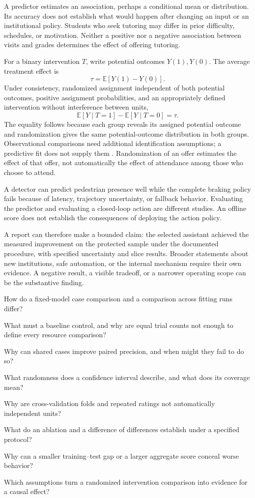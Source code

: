 A predictor estimates an association, perhaps a conditional mean or distribution. Its accuracy does not establish what would happen after changing an input or an institutional policy. Students who seek tutoring may differ in prior difficulty, schedules, or motivation. Neither a positive nor a negative association between visits and grades determines the effect of offering tutoring.

For a binary intervention $T$, write potential outcomes $Y(1),Y(0)$. The average treatment effect is
\[
\tau=\mathbb E[Y(1)-Y(0)].
\]
Under consistency, randomized assignment independent of both potential outcomes, positive assignment probabilities, and an appropriately defined intervention without interference between units,
\[
\mathbb E[Y\mid T=1]-\mathbb E[Y\mid T=0]=\tau.
\]
The equality follows because each group reveals its assigned potential outcome and randomization gives the same potential-outcome distribution in both groups. Observational comparisons need additional identification assumptions; a predictive fit does not supply them \citep{pearl2009}. Randomization of an offer estimates the effect of that offer, not automatically the effect of attendance among those who choose to attend.

A detector can predict pedestrian presence well while the complete braking policy fails because of latency, trajectory uncertainty, or fallback behavior. Evaluating the predictor and evaluating a closed-loop action are different studies. An offline score does not establish the consequences of deploying the action policy.

A report can therefore make a bounded claim: the selected assistant achieved the measured improvement on the protected sample under the documented procedure, with specified uncertainty and slice results. Broader statements about new institutions, safe automation, or the internal mechanism require their own evidence. A negative result, a visible tradeoff, or a narrower operating scope can be the substantive finding.

\begin{studyquestions}
\item How do a fixed-model case comparison and a comparison across fitting runs differ?
\item What must a baseline control, and why are equal trial counts not enough to define every resource comparison?
\item Why can shared cases improve paired precision, and when might they fail to do so?
\item What randomness does a confidence interval describe, and what does its coverage mean?
\item Why are cross-validation folds and repeated ratings not automatically independent units?
\item What do an ablation and a difference of differences establish under a specified protocol?
\item Why can a smaller training--test gap or a larger aggregate score conceal worse behavior?
\item Which assumptions turn a randomized intervention comparison into evidence for a causal effect?
\end{studyquestions}

